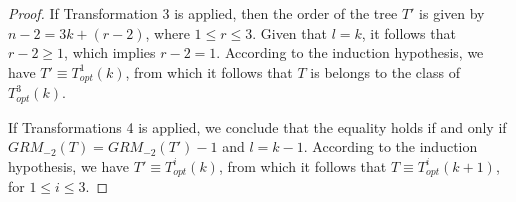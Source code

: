 \documentclass[preprint,12pt]{elsarticle}
\begin{document}
\begin{proof}
If Transformation 3 is applied, then the order of the tree $T'$ is given by $n - 2 = 3k + (r - 2)$, where $1 \leq r \leq 3$. Given that $l = k$, it follows that $r - 2 \geq 1$, which implies $ r - 2 =1$.
According to the induction hypothesis, we have $T' \equiv T^1_{opt} (k)$, from which it follows that $T$ is belongs to the class of $T^3_{opt} (k)$.

If Transformations 4 is applied, we conclude that the equality holds if and only if $GRM_{-2}(T) = GRM_{-2}(T')-1$ and $l = k-1$.
According to the induction hypothesis, we have $T' \equiv T^i_{opt} (k)$, from which it follows that $T\equiv T^i_{opt} (k+1)$, for $1\leq i\leq 3$.
\end{proof}









\end{document}

